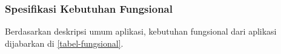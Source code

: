   \subsubsection{Spesifikasi Kebutuhan Fungsional}
  \vspace{-5mm}
  Berdasarkan deskripsi umum aplikasi, kebutuhan fungsional dari aplikasi dijabarkan di \ref{tabel-fungsional}.

  
